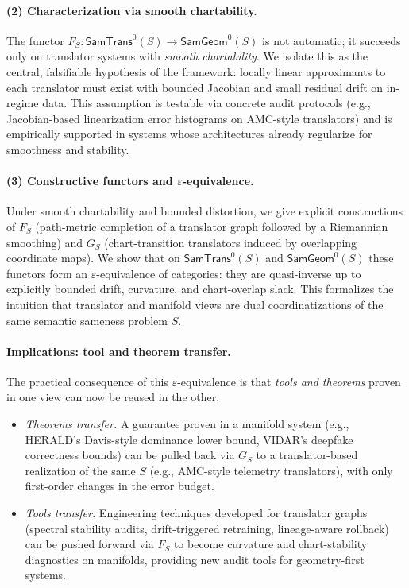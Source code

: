 \documentclass[11pt]{article}
\newcommand{\SamTrans}{\mathsf{SamTrans}}
\newcommand{\SamGeom}{\mathsf{SamGeom}}
\begin{document}
\paragraph{(2) Characterization via smooth chartability.}
The functor $F_S : \SamTrans^0(S) \to \SamGeom^0(S)$ is not automatic; it succeeds only on translator
systems with \emph{smooth chartability}.  We isolate this as the central, falsifiable hypothesis of
the framework: locally linear approximants to each translator must exist with bounded Jacobian and
small residual drift on in-regime data.  This assumption is testable via concrete audit protocols
(e.g., Jacobian-based linearization error histograms on AMC-style translators) and is empirically
supported in systems whose architectures already regularize for smoothness and stability.

\paragraph{(3) Constructive functors and $\varepsilon$-equivalence.}
Under smooth chartability and bounded distortion, we give explicit constructions of
$F_S$ (path-metric completion of a translator graph followed by a Riemannian smoothing) and
$G_S$ (chart-transition translators induced by overlapping coordinate maps).  We show that on
$\SamTrans^0(S)$ and $\SamGeom^0(S)$ these functors form an $\varepsilon$-equivalence of categories:
they are quasi-inverse up to explicitly bounded drift, curvature, and chart-overlap slack.  This
formalizes the intuition that translator and manifold views are dual coordinatizations of the same
semantic sameness problem $S$.

\paragraph{Implications: tool and theorem transfer.}
The practical consequence of this $\varepsilon$-equivalence is that \emph{tools and theorems} proven
in one view can now be reused in the other.

\begin{itemize}
  \item \emph{Theorems transfer.}  A guarantee proven in a manifold system (e.g., HERALD's
  Davis-style dominance lower bound, VIDAR's deepfake correctness bounds) can be pulled back via
  $G_S$ to a translator-based realization of the same $S$ (e.g., AMC-style telemetry translators),
  with only first-order changes in the error budget.
  \item \emph{Tools transfer.}  Engineering techniques developed for translator graphs (spectral
  stability audits, drift-triggered retraining, lineage-aware rollback) can be pushed forward via
  $F_S$ to become curvature and chart-stability diagnostics on manifolds, providing new audit
  tools for geometry-first systems.
\end{itemize}
\end{document}
